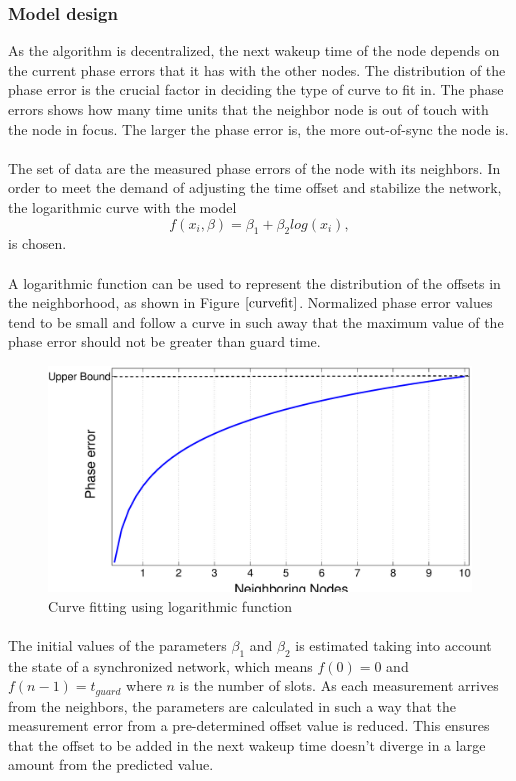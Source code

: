 \documentclass[a4paper,10pt]{report}
\begin{document}
\subsubsection{Model design}
As the algorithm is decentralized, the next wakeup time of the node depends on the current phase errors that it has with the other nodes. The distribution of the phase error is the crucial factor in deciding the type of curve to fit in. The phase errors shows how many time units that the neighbor node is out of touch with the node in focus. The larger the phase error is, the more out-of-sync the node is.\paragraph*{}
The set of data are the measured phase errors of the node with its neighbors. In order to meet the demand of adjusting the time offset and stabilize the network, the logarithmic curve with the model
\begin{equation}
 f(x_i,\beta)= \beta _1 + \beta_2log(x_i),
\end{equation}
is chosen. \paragraph*{}
A logarithmic function can be used to represent the distribution of the offsets in the neighborhood, as shown in Figure $\ref{curvefit}$. Normalized phase error values tend to be small and follow a curve in such away that the maximum value of the phase error should not be greater than guard time.
\begin{figure}
\centering
\includegraphics[width= 0.5 \textwidth]{curvefit}
\caption{Curve fitting using logarithmic function} \label{curvefit}
\end{figure}
\paragraph*{}
The initial values of the parameters $\beta_1$ and $\beta_2$ is estimated taking into account the state of a synchronized network, which means $f(0)=0$ and $f(n-1)=t_{guard}$ where $n$ is the number of slots. \newline 
As each measurement arrives from the neighbors, the parameters are calculated in such a way that the measurement error from a pre-determined offset value is reduced. This ensures that the offset to be added in the next wakeup time doesn't diverge in a large amount from the predicted value.
\end{document}
